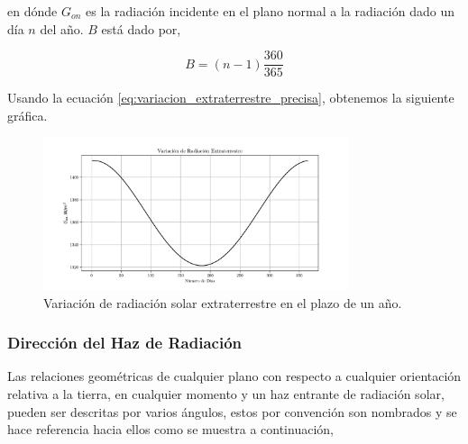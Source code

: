 en dónde $G_{on}$ es la radiación incidente en el plano normal a la radiación dado un día $n$ del año. $B$ está dado por,

\begin{equation}
	B = \left(n - 1\right) \frac{360}{365}
\end{equation}

Usando la ecuación \ref{eq:variacion_extraterrestre_precisa}, obtenemos la siguiente gráfica.

\begin{figure}[htbp]
	\centering
	\includegraphics[width=0.8\textwidth, angle=0]{images/variationextraterrestrialsolarradiation.pdf}
	\caption{Variación de radiación solar extraterrestre en el plazo de un año.}
\end{figure}

\subsubsection{Dirección del Haz de Radiación}

Las relaciones geométricas de cualquier plano con respecto a cualquier orientación relativa a la tierra, en cualquier momento y un haz entrante de radiación solar, pueden ser descritas por varios ángulos, estos por convención son nombrados y se hace referencia hacia ellos como se muestra a continuación,

